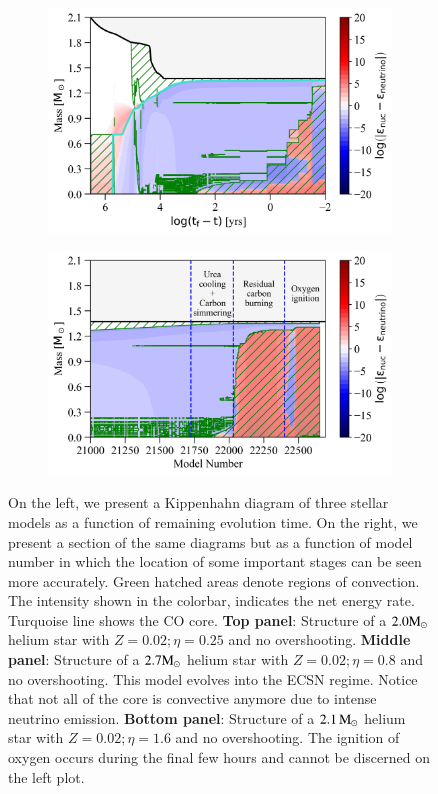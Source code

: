 \documentclass[main.tex]{subfiles}
\begin{document}
\begin{figure}[h!]
     \begin{subfigure}{.5\textwidth}
        \centering
        \includegraphics[width=0.95\columnwidth]{figures/chapter2/kipp/series2_rt_2p1M_eta1p58.png}
    \end{subfigure}\hfill
    \begin{subfigure}{.5\textwidth}
        \centering
        \includegraphics[width=0.95\columnwidth]{figures/chapter2/kipp/vs_model_number/series2_mn_2p1M_eta1p58.png}
    \end{subfigure}
    
    \caption{On the left, we present a Kippenhahn diagram of three \seriestwo stellar models as a function of remaining evolution time. On the right, we present a section of the same diagrams but as a function of model number in which the location of some important stages can be seen more accurately. Green hatched areas denote regions of convection. The intensity shown in the colorbar, indicates the net energy rate. Turquoise line shows the CO core. \textbf{Top panel}: Structure of a $2.0 \rm M_{\odot}$ helium star with $Z = 0.02; \eta = 0.25$ and no overshooting. \textbf{Middle panel}: Structure of a $2.7 \rm M_{\odot}$ helium star with $Z = 0.02; \eta = 0.8$ and no overshooting. This model evolves into the ECSN regime. Notice that not all of the core is convective anymore due to intense neutrino emission. \textbf{Bottom panel}: Structure of a $2.1\mathrm{\,M_\odot}$ helium star with $Z = 0.02; \eta = 1.6$ and no overshooting. The ignition of oxygen occurs during the final few hours  and cannot be discerned on the left plot.}
    \label{fig:Kipp_series2}
\end{figure}
\end{document}
